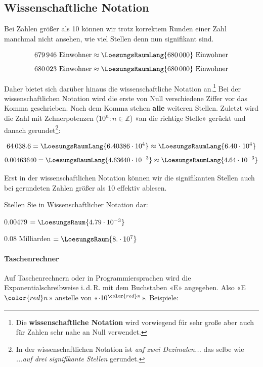 
\subsection{Wissenschaftliche Notation}\label{wissenschaftlicheNotation}
Bei Zahlen größer als 10 können wir trotz korrektem Runden einer Zahl manchmal nicht ansehen, wie viel Stellen denn nun signifikant sind.

$$ 679\,946 \text{\ Einwohner} \approx  \LoesungsRaumLang{680\,000} \text{\ Einwohner}$$
$$ 680\,023 \text{\ Einwohner} \approx  \LoesungsRaumLang{680\,000} \text{\ Einwohner}$$

Daher bietet sich darüber hinaus die wissenschaftliche Notation an.\footnote{Die
\textbf{wissenschaftliche Notation} wird vorwiegend für sehr große
aber auch für Zahlen sehr nahe an Null verwendet.}
Bei der wissenschaftlichen Notation wird die erste von Null verschiedene Ziffer
vor das Komma geschrieben. Nach dem Komma stehen \textbf{alle} weiteren Stellen.
Zuletzt wird die Zahl mit Zehnerpotenzen
($10^{n}: n \in \mathbb{Z}$) «an die richtige Stelle» gerückt und
danach gerundet\footnote{In der wissenschaftlichen Notation ist \textit{auf
  zwei Dezimalen...} das selbe wie \textit{...auf drei signifikante Stellen} gerundet.}:

$$64\,038.6  = \LoesungsRaumLang{6.40386 \cdot 10^{ 4}} \approx \LoesungsRaumLang{6.40 \cdot 10^{ 4}}$$
$$0.00463640 = \LoesungsRaumLang{4.63640 \cdot 10^{-3}} \approx \LoesungsRaumLang{4.64 \cdot 10^{-3}}$$

Erst in der wissenschaftlichen Notation können wir die signifikanten Stellen auch bei gerundeten Zahlen größer als 10 effektiv ablesen.


Stellen Sie in Wissenschaftlicher Notation dar:

0.00479 $= \LoesungsRaum{4.79 \cdot{}10^{-3}}$

0.08 Milliarden $= \LoesungsRaum{8.\cdot{}10^7}$



\newpage

\paragraph{Taschenrechner} Auf Taschenrechnern oder in
Programmiersprachen wird die Exponentialschreibweise i.\,d.\,R. mit dem
Buchstaben «E» angegeben. Also «E$\color{red}n$» anstelle von «$\cdot10^{\color{red}n}$». Beispiele:


